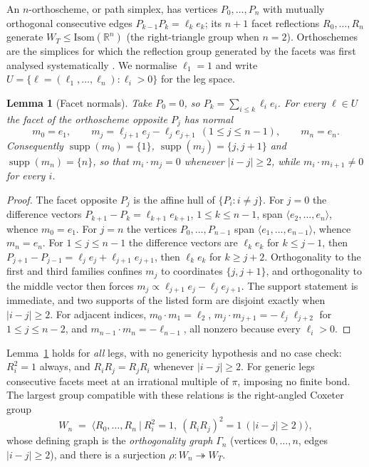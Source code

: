 \documentclass[11pt]{article}
\newcommand{\R}{\mathbb{R}}
\newtheorem{lemma}[theorem]{Lemma}
\theoremstyle{definition}
\begin{document}
An $n$-orthoscheme, or path simplex, has vertices $P_0,\dots,P_n$ with mutually orthogonal consecutive
edges $P_{k-1}P_k=\ell_k e_k$; its $n+1$ facet reflections $R_0,\dots,R_n$ generate
$W_T\le\mathrm{Isom}(\R^n)$ (the right-triangle group when $n=2$). Orthoschemes are the simplices for
which the reflection group generated by the facets was first analysed systematically
\cite{Coxeter1934}. We normalise $\ell_1=1$ and write $U=\{\ell=(\ell_1,\dots,\ell_n):
\ell_i>0\}$ for the leg space.

\begin{lemma}[Facet normals]
\label{lem:normals}
Take $P_0=0$, so $P_k=\sum_{i\le k}\ell_ie_i$. For every $\ell\in U$ the facet of the orthoscheme
opposite $P_j$ has normal
\[
   m_0=e_1,\qquad m_j=\ell_{j+1}e_j-\ell_je_{j+1}\ \ (1\le j\le n-1),\qquad m_n=e_n .
\]
Consequently $\operatorname{supp}(m_0)=\{1\}$, $\operatorname{supp}(m_j)=\{j,j+1\}$ and
$\operatorname{supp}(m_n)=\{n\}$, so that $m_i\cdot m_j=0$ whenever $|i-j|\ge2$, while
$m_i\cdot m_{i+1}\ne0$ for every $i$.
\end{lemma}

\begin{proof}
The facet opposite $P_j$ is the affine hull of $\{P_i:i\ne j\}$. For $j=0$ the difference vectors
$P_{k+1}-P_k=\ell_{k+1}e_{k+1}$, $1\le k\le n-1$, span $\langle e_2,\dots,e_n\rangle$, whence $m_0=e_1$.
For $j=n$ the vertices $P_0,\dots,P_{n-1}$ span $\langle e_1,\dots,e_{n-1}\rangle$, whence $m_n=e_n$.
For $1\le j\le n-1$ the difference vectors are $\ell_ke_k$ for $k\le j-1$, then
$P_{j+1}-P_{j-1}=\ell_je_j+\ell_{j+1}e_{j+1}$, then $\ell_ke_k$ for $k\ge j+2$. Orthogonality to the
first and third families confines $m_j$ to coordinates $\{j,j+1\}$, and orthogonality to the middle
vector then forces $m_j\propto\ell_{j+1}e_j-\ell_je_{j+1}$.
The support statement is immediate, and two supports of the listed form are disjoint exactly when
$|i-j|\ge2$. For adjacent indices, $m_0\cdot m_1=\ell_2$, $m_j\cdot m_{j+1}=-\ell_j\ell_{j+2}$ for
$1\le j\le n-2$, and $m_{n-1}\cdot m_n=-\ell_{n-1}$, all nonzero because every $\ell_i>0$.
\end{proof}

Lemma~\ref{lem:normals} holds for \emph{all} legs, with no genericity hypothesis and no case check:
$R_i^2=1$ always, and $R_iR_j=R_jR_i$ whenever $|i-j|\ge2$. For generic legs consecutive facets meet at
an irrational multiple of $\pi$, imposing no finite bond. The largest group compatible with these
relations is the right-angled Coxeter group \cite{Davis}
\[
   W_n \;=\; \bigl\langle R_0,\dots,R_n \ \big|\ R_i^2=1,\ (R_iR_j)^2=1\ (|i-j|\ge2)\bigr\rangle,
\]
whose defining graph is the \emph{orthogonality graph} $\Gamma_n$ (vertices $0,\dots,n$, edges
$|i-j|\ge2$), and there is a surjection $\rho\colon W_n\twoheadrightarrow W_T$.
\end{document}
